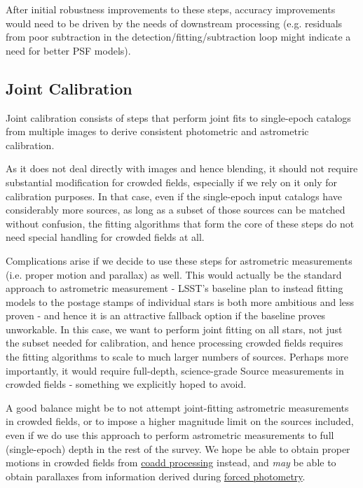 \documentclass[DM,authoryear,toc]{lsstdoc}
\begin{document}
After initial robustness improvements to these steps, accuracy improvements would need to be driven by the needs of downstream processing (e.g. residuals from poor subtraction in the detection/fitting/subtraction loop might indicate a need for better PSF models).

\subsection{Joint Calibration}
\label{sec:joint-calibration}

Joint calibration consists of steps that perform joint fits to single-epoch catalogs from multiple images to derive consistent photometric and astrometric calibration.

As it does not deal directly with images and hence blending, it should not require substantial modification for crowded fields, especially if we rely on it only for calibration purposes.
In that case, even if the single-epoch input catalogs have considerably more sources, as long as a subset of those sources can be matched without confusion, the fitting algorithms that form the core of these steps do not need special handling for crowded fields at all.

Complications arise if we decide to use these steps for astrometric measurements (i.e. proper motion and parallax) as well.
This would actually be the standard approach to astrometric measurement - LSST's baseline plan to instead fitting models to the postage stamps of individual stars is both more ambitious and less proven - and hence it is an attractive fallback option if the baseline proves unworkable.
In this case, we want to perform joint fitting on all stars, not just the subset needed for calibration, and hence processing crowded fields requires the fitting algorithms to scale to much larger numbers of sources.
Perhaps more importantly, it would require full-depth, science-grade Source measurements in crowded fields - something we explicitly hoped to avoid.

A good balance might be to not attempt joint-fitting astrometric measurements in crowded fields, or to impose a higher magnitude limit on the sources included, even if we do use this approach to perform astrometric measurements to full (single-epoch) depth in the rest of the survey.
We hope be able to obtain proper motions in crowded fields from \hyperref[sec:coadd-processing]{coadd processing} instead, and \emph{may} be able to obtain parallaxes from information derived during \hyperref[sec:forced-photometry]{forced photometry}.
\end{document}
